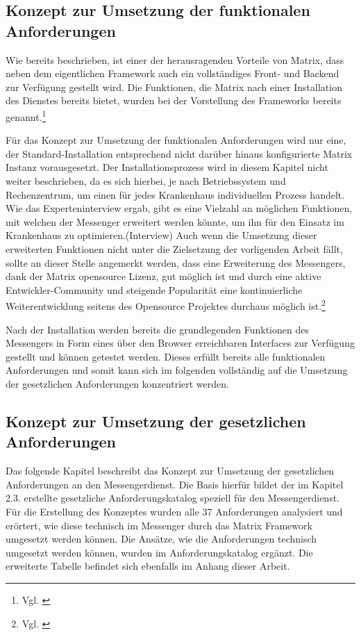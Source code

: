 \subsection{Konzept zur Umsetzung der funktionalen Anforderungen}\label{chapter:am}
Wie bereits beschrieben, ist einer der herausragenden Vorteile von Matrix, dass neben dem eigentlichen Framework auch ein vollständiges Front- und Backend zur Verfügung gestellt wird. Die Funktionen, die Matrix nach einer Installation des Dienstes bereits bietet, wurden bei der Vorstellung des Frameworks bereits genannt.\footnote{Vgl. \cite{Github2020}}

Für das Konzept zur Umsetzung der funktionalen Anforderungen wird nur eine, der Standard-Installation entsprechend nicht darüber hinaus konfigurierte Matrix Instanz vorausgesetzt.
Der Installationsprozess wird in diesem Kapitel nicht weiter beschrieben, da es sich hierbei, je nach Betriebssystem und Rechenzentrum, um einen für jedes Krankenhaus individuellen Prozess handelt.
Wie das Experteninterview ergab, gibt es eine Vielzahl an möglichen Funktionen, mit welchen der Messenger erweitert werden könnte, um ihn für den Einsatz im Krankenhaus zu optimieren.(Interview) Auch wenn die Umsetzung dieser erweiterten Funktionen nicht unter die Zielsetzung der vorligenden Arbeit fällt, sollte an dieser Stelle angemerkt werden, dass eine Erweiterung des Messengers, dank der Matrix opensource Lizenz, gut möglich ist und durch eine aktive Entwickler-Community und steigende Popularität eine kontinuierliche Weiterentwicklung seitens des Opensource Projektes durchaus möglich ist.\footnote{Vgl. \cite{Github2020}}

Nach der Installation werden bereits die grundlegenden Funktionen des Messengers in Form eines über den Browser erreichbaren Interfaces zur Verfügung gestellt und können getestet werden. Dieses erfüllt bereits alle funktionalen Anforderungen und somit kann sich im folgenden vollständig auf die Umsetzung der gesetzlichen Anforderungen konzentriert werden.

\subsection{Konzept zur Umsetzung der gesetzlichen Anforderungen}\label{chapter:vdmf}
Das folgende Kapitel beschreibt das Konzept zur Umsetzung der gesetzlichen Anforderungen an den Messengerdienst.
Die Basis hierfür bildet der im Kapitel 2.3. erstellte gesetzliche Anforderungskatalog speziell für den Messengerdienst. Für die Erstellung des Konzeptes wurden alle 37 Anforderungen analysiert und erörtert, wie diese technisch im Messenger durch das Matrix Framework umgesetzt werden können. Die Ansätze, wie die Anforderungen technisch umgesetzt werden können, wurden im Anforderungskatalog ergänzt. Die erweiterte Tabelle befindet sich ebenfalls im Anhang dieser Arbeit.

